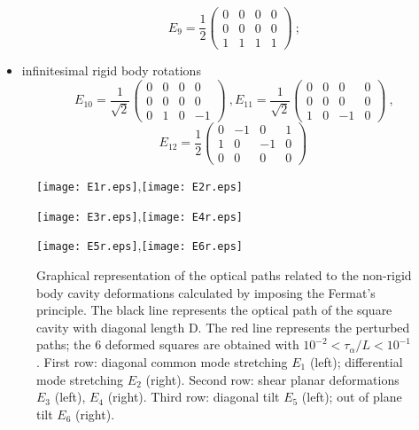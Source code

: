 \documentclass[12pt,a4paper,final]{iopart}
\begin{document}
\begin{itemize}
\[E_{9}=\frac{1}{2}\left(\begin{array}{cccc}
0 & 0 & 0 & 0\\
0 & 0 & 0 & 0\\
1 & 1 & 1 & 1
\end{array}\right)\ ;
\]
\item infinitesimal rigid body rotations 
\[
E_{10}=\frac{1}{\sqrt{2}}\left(\begin{array}{cccc}
0 & 0 & 0 & 0\\
0 & 0 & 0 & 0\\
0 & 1 & 0 & -1
\end{array}\right)\ ,
E_{11}=\frac{1}{\sqrt{2}}\left(\begin{array}{cccc}
0 & 0 & 0 & 0\\
0 & 0 & 0 & 0\\
1 & 0 & -1 & 0
\end{array}\right)\ ,
\]
\smallskip
\[
E_{12}=\frac{1}{2}\left(\begin{array}{cccc}
0 & -1 & 0 & 1\\
1 & 0 & -1 & 0\\
0 & 0 & 0 & 0
\end{array}\right)\
\]
\end{itemize}

\begin{figure}[h!!]
\centerline{\texttt{[image: E1r.eps]},\texttt{[image: E2r.eps]}}
\centerline{\texttt{[image: E3r.eps]},\texttt{[image: E4r.eps]}}
\centerline{\texttt{[image: E5r.eps]},\texttt{[image: E6r.eps]}}
\caption{\label{fig:d1} Graphical representation of the optical paths related
to the non-rigid body cavity deformations calculated by imposing the Fermat's 
principle.  The black line represents the optical path of the square
cavity with diagonal length D. The red line represents the perturbed paths; the 6 deformed squares are obtained with $10^{-2}<\tau_{\alpha}/L<10^{-1}$. 
First row: diagonal common mode stretching $E_{1}$ (left); differential
mode stretching $E_{2}$ (right). Second row: shear planar deformations $E_{3}$ (left), $E_{4}$ (right). Third row: diagonal tilt $E_{5}$ (left); out of plane tilt $E_{6}$ (right).  }
\end{figure}
\end{document}
